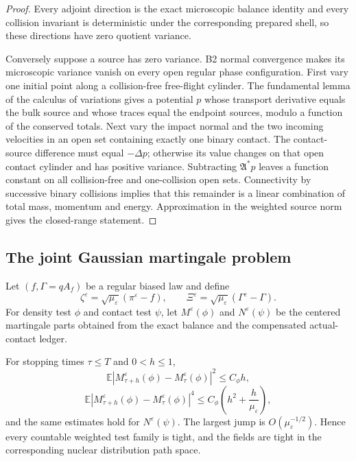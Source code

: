 \begin{proof}
Every adjoint direction is the exact microscopic balance identity and every
collision invariant is deterministic under the corresponding prepared shell,
so these directions have zero quotient variance.

Conversely suppose a source has zero variance.  B2 normal convergence makes
its microscopic variance vanish on every open regular phase configuration.
First vary one initial point along a collision-free free-flight cylinder.  The
fundamental lemma of the calculus of variations gives a potential \(p\) whose
transport derivative equals the bulk source and whose traces equal the
endpoint sources, modulo a function of the conserved totals.  Next vary the
impact normal and the two incoming velocities in an open set containing
exactly one binary contact.  The contact-source difference must equal
\(-\Delta p\); otherwise its value changes on that open contact cylinder and
has positive variance.  Subtracting \(\mathfrak A^*p\) leaves a function
constant on all collision-free and one-collision open sets.  Connectivity by
successive binary collisions implies that this remainder is a linear
combination of total mass, momentum and energy.  Approximation in the weighted
source norm gives the closed-range statement.
\end{proof}

\subsection{The joint Gaussian martingale problem}

Let \((f,\Gamma=qA_f)\) be a regular biased law and define
\[
 \zeta^\varepsilon=\sqrt{\mu_\varepsilon}(\pi^\varepsilon-f),
 \qquad
 \Xi^\varepsilon=\sqrt{\mu_\varepsilon}
 (\Gamma^\varepsilon-\Gamma).
\]
For density test \(\phi\) and contact test \(\psi\), let
\(M^\varepsilon(\phi)\) and \(N^\varepsilon(\psi)\) be the centered martingale
parts obtained from the exact balance and the compensated actual-contact
ledger.

\begin{lemma}
\label{lem:r5-b3-tight}
For stopping times \(\tau\le T\) and \(0<h\le1\),
\[
 \mathbb E|M_{\tau+h}^\varepsilon(\phi)-M_\tau^\varepsilon(\phi)|^2
 \le C_\phi h,
\]
\[
 \mathbb E|M_{\tau+h}^\varepsilon(\phi)-M_\tau^\varepsilon(\phi)|^4
 \le C_\phi\left(h^2+\frac h{\mu_\varepsilon}\right),
\]
and the same estimates hold for \(N^\varepsilon(\psi)\).  The largest jump is
\(O(\mu_\varepsilon^{-1/2})\).  Hence every countable weighted test family is
tight, and the fields are tight in the corresponding nuclear distribution
path space.
\end{lemma}

